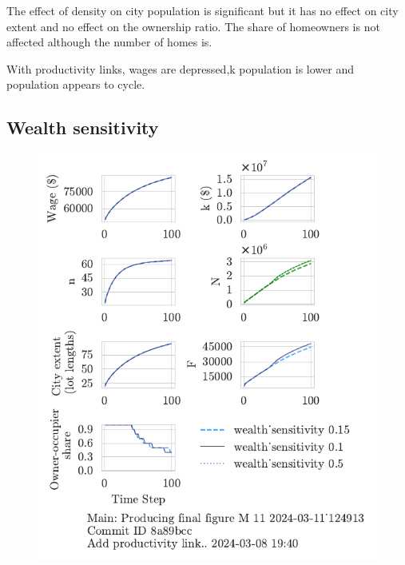 The effect of density on city population is significant but it has no effect on city extent and no effect on the ownership ratio. The share of homeowners is not affected although the number of homes is. 

With productivity links, wages are depressed,k population is lower and population appears to cycle.

\newpage %
\subsection{Wealth sensitivity}
\begin{figure}[h!tb] 
    \centering
    \includegraphics[scale=.75, trim={0 1.4cm 1.0cm 0},clip]{fig/wealth_sensitivity-124913.pdf} 

\end{figure}
